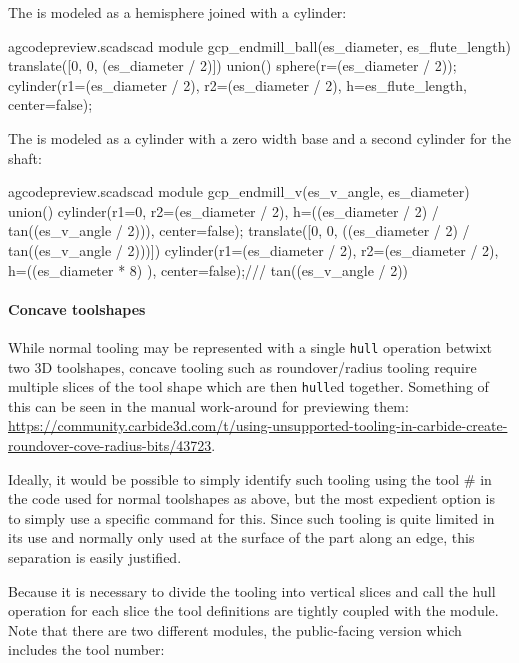 \documentclass{ltxdoc}
\begin{document}
The  is modeled as a hemisphere joined with a cylinder:
\lstset{firstnumber=\thegcpscad}
\begin{writecode}{a}{gcodepreview.scad}{scad}
module gcp_endmill_ball(es_diameter, es_flute_length) {
  translate([0, 0, (es_diameter / 2)]){
    union(){
      sphere(r=(es_diameter / 2));
      cylinder(r1=(es_diameter / 2), r2=(es_diameter / 2), h=es_flute_length, center=false);
    }
  }
}

\end{writecode}
\addtocounter{gcpscad}{9}

The  is modeled as a cylinder with a zero width base and
a second cylinder for the shaft:
\lstset{firstnumber=\thegcpscad}
\begin{writecode}{a}{gcodepreview.scad}{scad}
module gcp_endmill_v(es_v_angle, es_diameter) {
  union(){
    cylinder(r1=0, r2=(es_diameter / 2), h=((es_diameter / 2) / tan((es_v_angle / 2))), center=false);
    translate([0, 0, ((es_diameter / 2) / tan((es_v_angle / 2)))]){
      cylinder(r1=(es_diameter / 2), r2=(es_diameter / 2), h=((es_diameter * 8) ), center=false);/// tan((es_v_angle / 2))
    }
  }
}

\end{writecode}
\addtocounter{gcpscad}{9}
 
\paragraph{Concave toolshapes}
\label{para:concavetoolshapes} 
While normal tooling may be represented with a single \texttt{hull} operation betwixt two
3D toolshapes, concave tooling such as roundover/radius tooling require multiple slices
of the tool shape which are then \texttt{hull}ed together. Something of this can be seen
in the manual work-around for previewing them: 
\url{https://community.carbide3d.com/t/using-unsupported-tooling-in-carbide-create-roundover-cove-radius-bits/43723}.

Ideally, it would be possible to simply identify such tooling using the tool \# in the
code used for normal toolshapes as above, but the most expedient option is to simply
use a specific command for this. Since such tooling is quite limited in its use and 
normally only used at the surface of the part along an edge, this separation is 
easily justified.

Because it is necessary to divide the tooling into vertical slices and call the hull operation 
for each slice the tool definitions are tightly coupled with the module. Note that there are 
two different modules, the public-facing version which includes the tool number:
 
\end{document}
